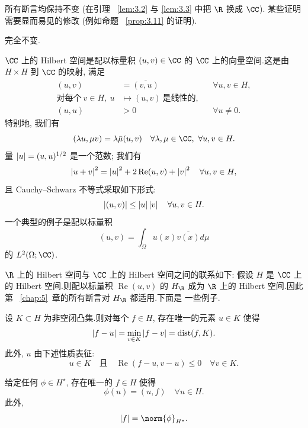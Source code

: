  所有断言均保持不变 (在引理~
\ref{lem:3.2} 与 \ref{lem:3.3} 中把 $\R$ 换成 $\CC$).
某些证明需要显而易见的修改 (例如命题~
\ref{prop:3.11} 的证明).

 完全不变.

 $\CC$ 上的 Hilbert 空间是配以标量积 $(u,v)\in\CC$ 的 $\CC$
上的向量空间.这是由 $H\times H$ 到 $\CC$ 的映射, 满足
\begin{align*}
(u,v)&=\overline{(v,u)} &&\forall u,v\in H,\\
\text{对每个}\ v\in H,\ u&\mapsto(u,v)\ \text{是线性的},\\
(u,u)&>0 &&\forall u\ne0.
\end{align*}
特别地, 我们有
\begin{equation*}
(\lambda u,\mu v)=\lambda\bar\mu(u,v)\quad\forall\lambda,\mu\in\CC,\
\forall u,v\in H.
\end{equation*}
量 $\left|u\right|=(u,u)^{1/2}$ 是一个范数; 我们有
\begin{equation*}
\left|u+v\right|^2=\left|u\right|^2+2\operatorname{Re}(u,v)+\left|v\right|^2\quad\forall u,v\in H,
\end{equation*}
且 Cauchy--Schwarz 不等式采取如下形式:
\begin{equation*}
\left|(u,v)\right|\le\left|u\right|\left|v\right|\quad\forall u,v\in H.
\end{equation*}
一个典型的例子是配以标量积
\begin{equation*}
(u,v)=\int_\Omega u(x)\overline{v(x)}d\mu
\end{equation*}
的 $L^2(\Omega;\CC)$.

$\R$ 上的 Hilbert 空间与 $\CC$ 上的 Hilbert 空间之间的联系如下: 假设 $H$
是 $\CC$ 上的 Hilbert 空间.则配以标量积 $\operatorname{Re}(u,v)$ 的 $H_\R$
成为 $\R$ 上的 Hilbert 空间.因此第~
\ref{chap:5}~章的所有断言对 $H_\R$ 都适用.下面是
一些例子.

\begin{proposition}
\label{prop:11.26}
设 $K\subset H$ 为非空闭凸集.则对每个 $f\in H$, 存在唯一的元素 $u\in K$
使得
\begin{equation*}
\left|f-u\right|=\min_{v\in K}\left|f-v\right|=\operatorname{dist}(f,K).
\end{equation*}
此外, $u$ 由下述性质表征:
\begin{equation*}
u\in K\quad\text{且}\quad\operatorname{Re}(f-u,v-u)\le0\quad\forall v\in K.
\end{equation*}
\end{proposition}

\begin{proposition}
\label{prop:11.27}
给定任何 $\phi\in H^\star$, 存在唯一的 $f\in H$ 使得
\begin{equation*}
\phi(u)=(u,f)\quad\forall u\in H.
\end{equation*}
此外,
\begin{equation*}
\abs{f}=\norm{\phi}_{H^\star}.
\end{equation*}
\end{proposition}

